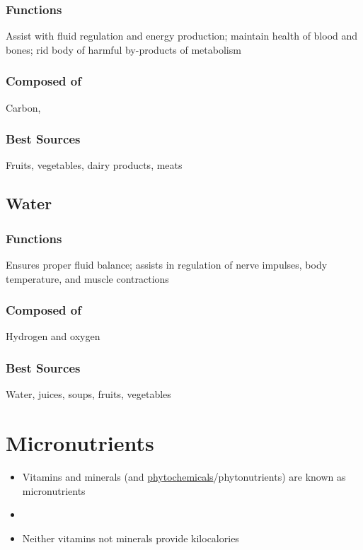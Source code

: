 \documentclass[title={Chapter 1}]{fdsn201notes}
\begin{document}
\subsubsection{Functions} Assist with fluid regulation and energy production; maintain health of blood and bones; rid body of harmful by-products of metabolism

\subsubsection{Composed of} Carbon,  %

\subsubsection{Best Sources} Fruits, vegetables, dairy products, meats

\textcolor{nutrientblue}{\subsection{Water}\label{subsec:water}}
\subsubsection{Functions} Ensures proper fluid balance; assists in regulation of nerve impulses, body temperature, and muscle contractions

\subsubsection{Composed of} Hydrogen and oxygen

\subsubsection{Best Sources} Water, juices, soups, fruits, vegetables

\section{Micronutrients}\label{sec:micronutrients}
\begin{itemize}
	\item Vitamins and minerals (and \hyperref[dfn:phytochemicals]{phytochemicals}/phytonutrients) are known as micronutrients
	\item {}
	\item Neither vitamins not minerals provide kilocalories
\end{itemize}
\end{document}
